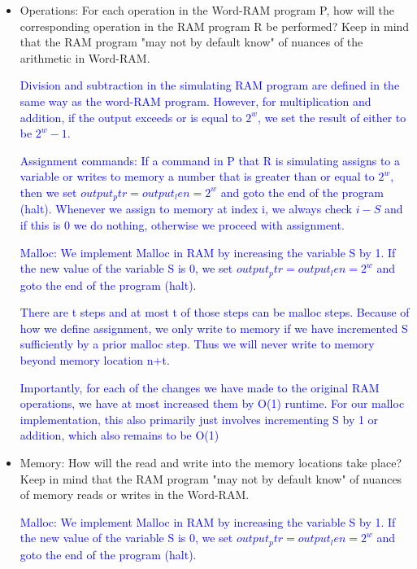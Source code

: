 \documentclass[11pt]{report}
\begin{document}
\begin{enumerate}
\begin{itemize}
\textcolor{blue}{Additionally, if any $x[i] > 2^w-1$ where $x\in [n]$, then we set $output_ptr = output_len = 2^w$ and goto the end of the program (halt)}

\textcolor{blue}{Lastly, if $n>2^2$ then set $output_ptr = output_len = 2^w$ and goto the end of the program (halt).}

\item Operations: For each operation in the Word-RAM program P, how will the corresponding operation in the RAM program R be performed? Keep in mind that the RAM program "may not by default know" of nuances of the arithmetic in Word-RAM.

\textcolor{blue}{Division and subtraction in the simulating RAM program are defined in the same way as the word-RAM program. However, for multiplication and addition, if the output exceeds or is equal to $2^{w}$, we set the result of either to be $2^w - 1$.}

\textcolor{blue}{Assignment commands: If a command in P that R is simulating assigns to a variable or writes to memory a number that is greater than or equal to $2^w$, then we set $output_ptr = output_len = 2^w$ and goto the end of the program (halt). Whenever we assign to memory at index i, we always check $i-S$ and if this is 0 we do nothing, otherwise we proceed with assignment.}

\textcolor{blue}{Malloc: We implement Malloc in RAM by increasing the variable S by 1. If the new value of the variable S is 0, we set $output_ptr = output_len = 2^w$ and goto the end of the program (halt).}

\textcolor{blue}{There are t steps and at most t of those steps can be malloc steps. Because of how we define assignment, we only write to memory if we have incremented S sufficiently by a prior malloc step. Thus we will never write to memory beyond memory location n+t.}

\textcolor{blue}{Importantly, for each of the changes we have made to the original RAM operations, we have at most increased them by O(1) runtime. For our malloc implementation, this also primarily just involves incrementing S by 1 or addition, which also remains to be O(1)}

\item Memory: How will the read and write into the memory locations take place? Keep in mind that the RAM program "may not by default know" of nuances of memory reads or writes in the Word-RAM.

\textcolor{blue}{Malloc: We implement Malloc in RAM by increasing the variable S by 1. If the new value of the variable S is 0, we set $output_ptr = output_len = 2^w$ and goto the end of the program (halt).}


\end{itemize}
\end{enumerate}
\end{document}
